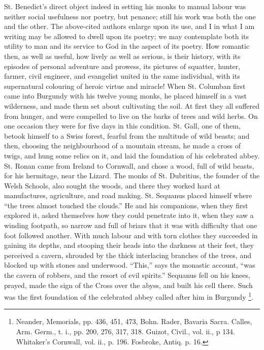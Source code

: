 St. Benedict's direct object indeed in setting his monks to manual
labour was neither social usefulness nor poetry, but penance; still
his work was both the one and the other. The above-cited authors
enlarge upon its use, and I in what I am writing may be allowed to
dwell upon its poetry; we may contemplate both its utility to man and
its service to God in the aspect of its poetry. How romantic then, as
well as useful, how lively as well as serious, is their history, with
its episodes of personal adventure and prowess, its pictures of
squatter, hunter, farmer, civil engineer, and evangelist united in the
same individual, with its supernatural colouring of heroic virtue and
miracle! When St. Columban first came into Burgundy with his twelve
young monks, he placed himself in a vast wilderness, and made them set
about cultivating the soil. At first they all suffered from hunger,
and were compelled to live on the barks of trees and wild herbs. On
one occasion they were for five days in this condition. St. Gall, one
of them, betook himself to a Swiss forest, fearful from the multitude
of wild beasts; and then, choosing the neighbourhood of a mountain
stream, he made a cross of twigs, and hung some relics on it, and laid
the foundation of his celebrated abbey. St. Ronan came from Ireland to
Cornwall, and chose a wood, full of wild beasts, for his hermitage,
near the Lizard. The monks of St. Dubritius, the founder of the Welsh
Schools, also sought the woods, and there they worked hard at
manufactures, agriculture, and road making. St. Sequanus placed
himself where ``the trees almost touched the clouds.'' He and
his companions, when they first explored it, asked themselves how they
could penetrate into it, when they saw a winding footpath, so narrow
and full of briars that it was with difficulty that one foot followed
another. With much labour and with torn clothes they succeeded
in gaining its depths, and stooping their heads into the darkness at
their feet, they perceived a cavern, shrouded by the thick interlacing
branches of the trees, and blocked up with stones and underwood.
``This,'' says the monastic account, ``was the cavern of
robbers, and the resort of evil spirits.'' Sequanus fell on his
knees, prayed, made the sign of the Cross over the abyss, and built
his cell there. Such was the first foundation of the celebrated abbey
called after him in Burgundy \footnote{Neander,
Memorials, pp. 436, 451, 473, Bohn. Rader, Bavaria Sacra. Calles, Arm.
Germ., t. i., pp. 200, 276, 317, 318. Guizot, Civil., vol. ii., p 134.
Whitaker's Cornwall, vol. ii., p. 196. Fosbroke, Antiq. p. 16.}.

